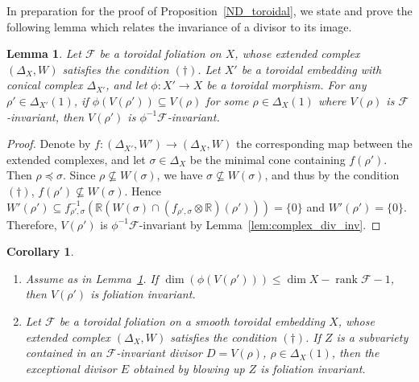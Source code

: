 \documentclass[12pt,reqno]{amsart}
\newtheorem{lemma}[theorem]{Lemma}
\newtheorem{corollary}[theorem]{Corollary}
\theoremstyle{definition}
\newcommand{\on}{\operatorname}
\newcommand\cF{{\mathcal{F}}}
\newcommand\bR{{\mathbb R}}
\begin{document}
In preparation for the proof of Proposition~\ref{ND_toroidal}, we state and prove the following lemma which relates the invariance of a divisor to its image. 
\begin{lemma}\label{lem:contained_in_invariant_divisor}
    Let $\cF$ be a toroidal foliation on $X$, whose extended complex $(\Delta_X,W)$ satisfies the condition $(\dagger)$. Let $X'$ be a toroidal embedding with conical complex $\Delta_{X'}$, and let $\phi\colon X' \to X$ be a toroidal morphism. 
    For any $\rho'\in\Delta_{X'}(1)$, if $\phi(V(\rho'))\subseteq V(\rho)$ for some $\rho \in \Delta_X(1)$ where $V(\rho)$ is $\cF$-invariant, then $V(\rho')$ is $\phi^{-1}\cF$-invariant.
\end{lemma}
\begin{proof}
    Denote by $f\colon (\Delta_{X'},W')\to(\Delta_X,W)$ the corresponding map between the extended complexes, and let $\sigma\in \Delta_X$ be the minimal cone containing $f(\rho')$. Then $\rho\preceq \sigma$. Since $\rho\nsubseteq W(\sigma)$, we have $\sigma\nsubseteq W(\sigma)$, and thus by the condition $(\dagger)$, $f(\rho')\nsubseteq W(\sigma)$. Hence $W'(\rho')\subseteq f_{\rho',\sigma}^{-1}(\bR(W(\sigma)\cap (f_{\rho',\sigma}\otimes\bR)(\rho')))=\{0\}$ and $W'(\rho')=\{0\}$. 
    Therefore, $V(\rho')$ is $\phi^{-1}\cF$-invariant by Lemma~\ref{lem:complex_div_inv}.
\end{proof}
\begin{corollary}\label{cor:contained_in_invariant_divisor}
    \begin{enumerate}
        \item Assume as in Lemma~\ref{lem:contained_in_invariant_divisor}. If $\dim(\phi(V(\rho'))) \leq \dim X-\on{rank}\cF-1$, then $V(\rho')$ is foliation invariant.
        \item Let $\cF$ be a toroidal foliation on a smooth toroidal embedding $X$, whose extended complex $(\Delta_X,W)$ satisfies the condition $(\dagger)$.  If $Z$ is a subvariety contained in an $\cF$-invariant divisor $D=V(\rho)$, $\rho \in \Delta_X(1)$, then the exceptional divisor $E$ obtained by blowing up $Z$ is foliation invariant.
    \end{enumerate}
\end{corollary}
\end{document}
